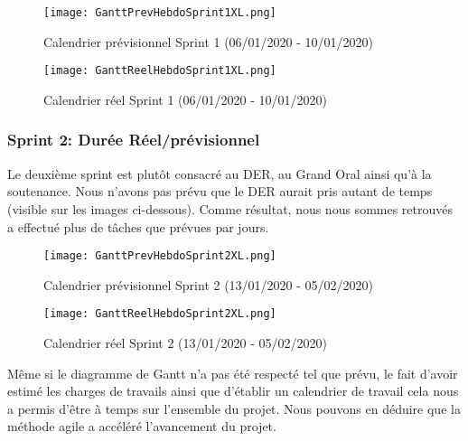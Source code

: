 \begin{figure}[h!]
  \centering
  \texttt{[image: GanttPrevHebdoSprint1XL.png]}
	\caption[]{Calendrier prévisionnel Sprint 1 (06/01/2020 - 10/01/2020)}
	\label{}
\end{figure}

\begin{figure}[h!]
  \centering
  \texttt{[image: GanttReelHebdoSprint1XL.png]}
	\caption[]{Calendrier réel Sprint 1 (06/01/2020 - 10/01/2020)}
	\label{}
\end{figure}



\subsubsection{Sprint 2: Durée Réel/prévisionnel}
Le deuxième sprint est plutôt consacré au DER, au Grand Oral ainsi qu'à la soutenance.
Nous n'avons pas prévu que le DER aurait pris autant de temps (visible sur les images ci-dessous).
Comme résultat, nous nous sommes retrouvés a effectué plus de tâches que prévues par jours. 

\begin{figure}[h!]
  \centering
  \texttt{[image: GanttPrevHebdoSprint2XL.png]}
	\caption[]{Calendrier prévisionnel Sprint 2 (13/01/2020 - 05/02/2020)}
	\label{}
\end{figure}

\begin{figure}[h!]
  \centering
  \texttt{[image: GanttReelHebdoSprint2XL.png]}
	\caption[]{Calendrier réel Sprint 2 (13/01/2020 - 05/02/2020)}
	\label{}
\end{figure}

Même si le diagramme de Gantt n'a pas été respecté tel que prévu, le fait d’avoir estimé les charges de travails ainsi que d'établir un calendrier de travail cela nous a permis d'être à temps sur l’ensemble du projet.
Nous pouvons en déduire que la méthode agile a accéléré l'avancement du projet.








